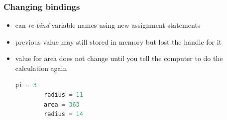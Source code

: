\documentclass[notes]{beamer}
\begin{document}
\begin{frame}[fragile]
	\frametitle{Changing bindings}
	\begin{itemize}
		\item can \textit{re-bind} variable names using new assignment
		statements
		\item previous value may still stored in memory but lost the
		handle for it
		\item value for area does not change until you tell the computer to do the calculation again
		\begin{lstlisting}[language=Python]
		pi = 3
		radius = 11
		area = 363
		radius = 14
		\end{lstlisting}
	\end{itemize}
\end{frame}
\end{document}
